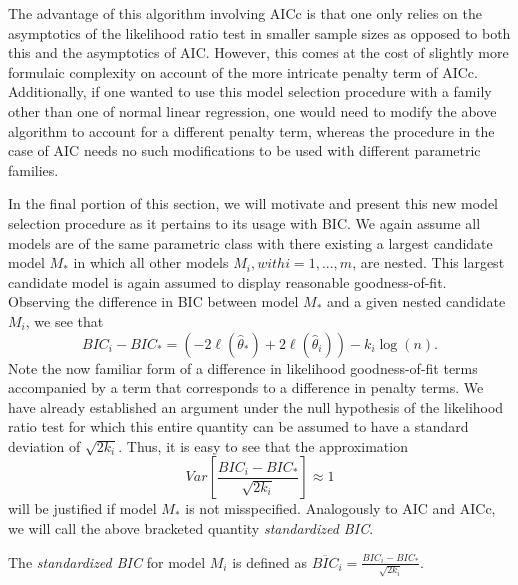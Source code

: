 		The advantage of this algorithm involving AICc is that one only relies on the asymptotics of the likelihood ratio test in smaller sample sizes as opposed
		to both this and the asymptotics of AIC. However, this comes at the cost of slightly more formulaic complexity on account of the more intricate
		penalty term of AICc. Additionally, if one wanted to use this model selection procedure with a family other than one of normal linear regression,
		one would need to modify the above algorithm to account for a different penalty term, whereas the procedure in the case of AIC needs no such modifications
		to be used with different parametric families.

		In the final portion of this section, we will motivate and present this new model selection procedure as it pertains to its usage with BIC. We again assume
		all models are of the same parametric class with there existing a largest candidate model $M_*$ in which all other models $M_i, with i = 1,...,m$, are nested.
		This largest candidate model is again assumed to display reasonable goodness-of-fit. Observing the difference in BIC between model $M_*$ and a given
		nested candidate $M_i$, we see that
		\begin{equation}
			BIC_i - BIC_* = \left( -2 \ell (\hat{\theta}_*) + 2 \ell (\hat{\theta}_i) \right) - k_i \log(n) .
		\end{equation}
		Note the now familiar form of a difference in likelihood goodness-of-fit terms accompanied by a term that corresponds to a difference in penalty terms.
		We have already established an argument under the null hypothesis of the likelihood ratio test for which this entire quantity can be assumed to have
		a standard deviation of $\sqrt{2k_i}$. Thus, it is easy to see that the approximation
		\begin{equation}
			Var \left[ \frac{BIC_i - BIC_*}{\sqrt{2k_i}} \right] \approx 1 
		\end{equation}
		will be justified if model $M_*$ is not misspecified. Analogously to AIC and AICc, we will call the above bracketed quantity \textit{standardized BIC}.
		\begin{definition}
			The \textit{standardized BIC} for model $M_i$ is defined as $\overline{BIC}_i = \frac{BIC_i - BIC_*}{\sqrt{2k_i}}$.
		\end{definition}

